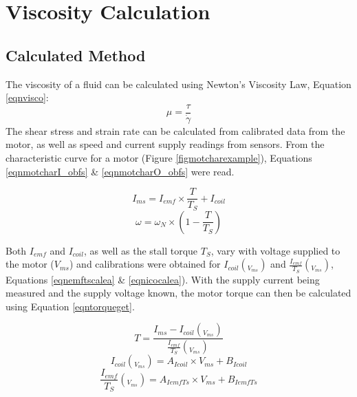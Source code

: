 \documentclass[twoside,a4]{report}
\begin{document}
	
	\section{Viscosity Calculation}
	\subsection*{Calculated Method}
	The viscosity of a fluid can be calculated using Newton's Viscosity Law, Equation \ref{eqnvisco}:
	\[\mu = \frac{\tau}{\dot{\gamma}}\]
	\newline
	The shear stress and strain rate can be calculated from calibrated data from the motor, as well as speed and current supply readings from sensors. From the characteristic curve for a motor (Figure \ref{figmotcharexample}), Equations \ref{eqnmotcharI_obfs} \& \ref{eqnmotcharO_obfs} were read.
	
	\begin{equation}
		I_{ms} = I_{emf} \times \frac{T}{T_S} + I_{coil}
		\label{eqnmotcharI_obfs}
	\end{equation}
	\begin{equation}
		\omega = \omega_N \times \left(1 - \frac{T}{T_S}\right)
		\label{eqnmotcharO_obfs}
	\end{equation}
	
	\noindent
	Both $I_{emf}$ and $I_{coil}$, as well as the stall torque $T_S$, vary with voltage supplied to the motor ($V_{ms}$) and calibrations were obtained for $I_{coil} (_{V_{ms}})$ and $\frac{I_{emf}}{T_S} (_{V_{ms}})$, Equations \ref{eqnemftscalea} \& \ref{eqnicocalea}). With the supply current being measured and the supply voltage known, the motor torque can then be calculated using Equation \ref{eqntorqueget}.

	\begin{equation}
		T = \frac{I_{ms} - I_{coil} (_{V_{ms}})}{\frac{I_{emf}}{T_S} (_{V_{ms}})}
		\label{eqntorqueget}
	\end{equation}
	\begin{equation}
		I_{coil} (_{V_{ms}}) = A_{Icoil} \times V_{ms} + B_{Icoil}
		\label{eqnicocalea}
	\end{equation}
	\begin{equation}
		\frac{I_{emf}}{T_S} (_{V_{ms}}) = A_{IemfTs} \times V_{ms} + B_{IemfTs}
		\label{eqnemftscalea}
	\end{equation}
	
\end{document}
